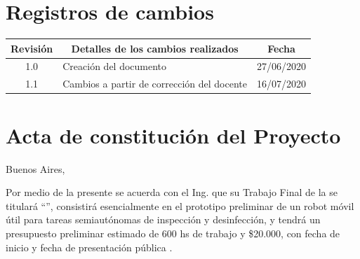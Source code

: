 \documentclass[11pt]{charter}
\begin{document}
\maketitle
\thispagestyle{empty}
\pagebreak


\thispagestyle{empty}
{\setlength{\parskip}{0pt}
\tableofcontents{}
}
\pagebreak


\section{Registros de cambios}
\label{sec:registro}


\begin{table}[ht]
\label{tab:registro}
\centering

\begin{tabularx}{\linewidth}{@{}|c|X|c|@{}}
\hline
\rowcolor[HTML]{C0C0C0} 
Revisión & \multicolumn{1}{c|}{\cellcolor[HTML]{C0C0C0}Detalles de los cambios realizados} & Fecha      \\ \hline
1.0      & Creación del documento                                                          & 27/06/2020 \\ \hline
1.1      & Cambios a partir de corrección del docente                                                                                																						   & 16/07/2020 \\ \hline
\end{tabularx}
\end{table}

\pagebreak



\section{Acta de constitución del Proyecto}
\label{sec:acta}

\begin{flushright}
Buenos Aires, \fechaInicioName
\end{flushright}

\vspace{2cm}

Por medio de la presente se acuerda con el Ing. \authorname\hspace{1px} que su Trabajo Final de la \degreename\hspace{1px} se titulará ``\ttitle'', consistirá esencialmente en el prototipo preliminar de un robot móvil útil para tareas semiautónomas de inspección y desinfección, y tendrá un presupuesto preliminar estimado de 600 hs de trabajo y \$20.000, con fecha de inicio \fechaInicioName\hspace{1px} y fecha de presentación pública \fechaFinalName.
\end{document}
